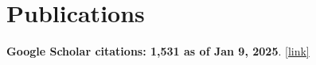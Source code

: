 \documentclass[11pt,a4paper,roman]{moderncv} %
\begin{document}
\section{Publications}
\vspace*{1mm}
{\color{color1} {\bfseries Google Scholar citations: 1,531 as of Jan 9, 2025}. \href{https://scholar.google.com/citations?user=Aqf-7Y0AAAAJ&hl=en}{[link]}}

\vspace*{3mm}
\end{document}
